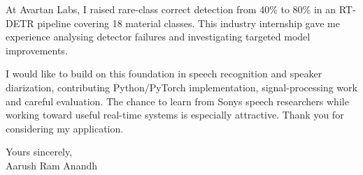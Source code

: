 \documentclass[11pt,a4paper]{article}
\begin{document}
At Avartan Labs, I raised rare-class correct detection from 40\% to 80\% in an RT-DETR pipeline covering 18 material classes. This industry internship gave me experience analysing detector failures and investigating targeted model improvements.\par\vspace{10pt}
I would like to build on this foundation in speech recognition and speaker diarization, contributing Python/PyTorch implementation, signal-processing work and careful evaluation. The chance to learn from Sony\textquotesingle s speech researchers while working toward useful real-time systems is especially attractive. Thank you for considering my application.\par\vspace{14pt}
Yours sincerely,\\[5pt]
Aarush Ram Anandh
\end{document}
